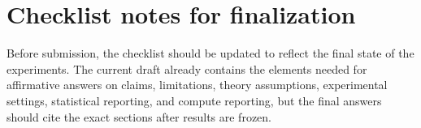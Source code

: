 \documentclass{article}
\begin{document}
\section{Checklist notes for finalization}
\label{app:checklist-notes}

Before submission, the checklist should be updated to reflect the final state of the experiments.
The current draft already contains the elements needed for affirmative answers on claims, limitations, theory assumptions, experimental settings, statistical reporting, and compute reporting, but the final answers should cite the exact sections after results are frozen.
\end{document}
